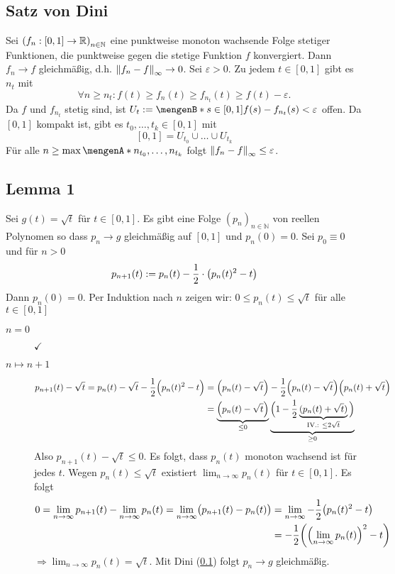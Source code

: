 \subsection{Satz von Dini} %
\label{sub:64}
Sei $\enbrace*{f_n : [0,1] \to \mathds{R}}_{n \in \mathds{N}}$ eine punktweise monoton wachsende Folge stetiger Funktionen, die punktweise gegen die stetige Funktion $f$
konvergiert. Dann $f_n \to f$ gleichmäßig, d.h. $\norm[\infty]{f_n -f} \to 0 $.
Sei $\varepsilon >0$. Zu jedem $t \in [0,1]$ gibt es $n_t$ mit 
\[
	\forall n\ge n_t : f(t) \ge f_n(t) \ge f_{n_t}(t) \ge f(t) - \varepsilon. 
\]
Da $f$ und $f_{n_t}$ stetig sind,
ist $U_t := \set[{s \in [0,1]}]{f(s) - f_{n_t}(s) < \varepsilon} $ offen. Da $[0,1]$ kompakt ist, gibt es $t_0, \ldots , t_k \in [0,1]$ mit 
\[
	[0,1] = U_{t_0} \cup \ldots \cup U_{t_k}
\]
Für alle $n \ge \max \set{n_{t_0}, \ldots , n_{t_k}} $ folgt
\(
	\norm[\infty]{f_n - f} \le \varepsilon
\). \bewende 

\subsection[Lemma 1: Folge reeller Polynome, die gleichmäßig gegen Wurzelfunktion konvergiert]{Lemma 1} %
\label{sub:65}
Sei $g(t) = \sqrt{t}$ für $t \in [0,1]$. Es gibt eine Folge $(p_n)_{n \in \mathds{N}}$ von reellen Polynomen so dass $p_n \to g$ gleichmäßig auf $[0,1]$ und $p_n(0)=0$.
Sei $p_0 \equiv 0$ und für $n > 0$
\[
	p_{n+1} (t) := p_n(t) - \frac{1}{2} \cdot \enbrace[\big]{p_n(t)^2 - t} 
\]
Dann $p_n(0)=0$. Per Induktion nach $n$ zeigen wir: $0 \le p_n(t) \le \sqrt{t}$ für alle $t \in [0,1]$
\begin{description}
	\item[$n=0$] $\checkmark$ 
	\item[$n \mapsto n+1$] \begin{align*}
		p_{n+1}(t) - \sqrt{t} = p_n(t) - \sqrt{t} - \frac{1}{2} \enbrace[\Big]{p_n(t)^2 -t} &= \enbrace*{p_n(t) - \sqrt{t} }- \frac{1}{2} \enbrace*{p_n(t)- \sqrt{t}} 
		\enbrace*{p_n(t) + \sqrt{t}}        \\
		&=\underbrace{\enbrace*{p_n(t) - \sqrt{t}  } }_{\le 0} \underbrace{\Big( 1- \frac{1}{2}\underbrace{(p_n(t) + \sqrt{t}  )}_{\text{IV.: }\le 2 \sqrt{t}  } \Big)}_{\ge 0} 
	\end{align*}
	Also $p_{n+1}(t)- \sqrt{t} \le 0$. Es folgt, dass $p_n(t)$ monoton wachsend ist für jedes $t$. Wegen $p_n(t) \le \sqrt{t}$ existiert $\lim_{ n \to \infty} p_n(t)$
	für $t \in [0,1]$. Es folgt 
	\begin{align*}
		0 = \lim_{ n \to \infty} p_{n+1}(t) - \lim_{ n \to \infty} p_n(t) = \lim_{ n \to \infty} \enbrace[\big]{p_{n+1}(t) - p_n(t)} &= \lim_{ n \to \infty} 
		-\frac{1}{2} \enbrace[\big]{p_n(t)^2 -t  } \\
		&= - \frac{1}{2} \enbrace*{ \enbrace*{\lim_{ n \to \infty} p_n(t)}^2 -t }  
	\end{align*}
	$\Rightarrow \lim_{ n \to \infty} p_n(t) = \sqrt{t}$. Mit Dini (\ref{sub:64}) folgt $p_n \to g$ gleichmäßig. \bewende
\end{description}

